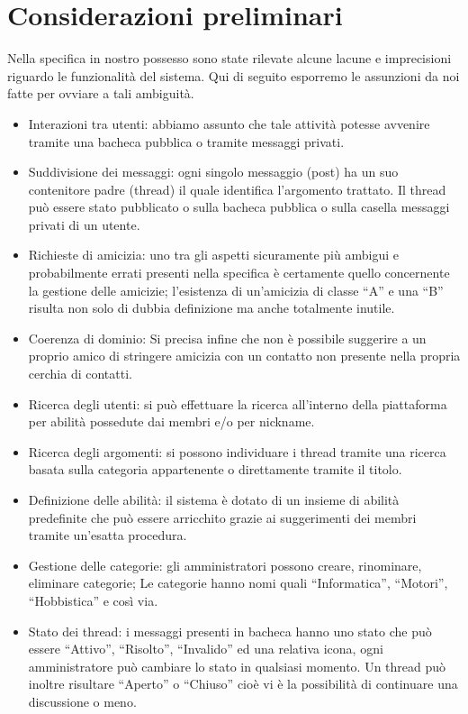 \documentclass[a4paper,12pt]{article}
\begin{document}
\section{Considerazioni preliminari}
Nella specifica in nostro possesso sono state rilevate alcune lacune e imprecisioni riguardo le funzionalità del sistema.
Qui di seguito esporremo le assunzioni da noi fatte per ovviare a tali ambiguità.
\begin{itemize}
\item Interazioni tra utenti: abbiamo assunto che tale attività potesse avvenire tramite una bacheca pubblica o tramite messaggi privati.
\item Suddivisione dei messaggi: ogni singolo messaggio (post) ha un suo contenitore padre (thread) il quale identifica l’argomento trattato. Il thread può essere stato pubblicato o sulla bacheca pubblica o sulla casella messaggi privati di un utente.
\item Richieste di amicizia: uno tra gli aspetti sicuramente più ambigui e probabilmente errati presenti nella specifica è certamente quello concernente la gestione delle amicizie; l’esistenza di un’amicizia di classe “A” e una “B” risulta non solo di dubbia definizione ma anche totalmente inutile.
\item Coerenza di dominio: Si precisa infine che non è possibile suggerire a un proprio amico di stringere amicizia con un contatto non presente nella propria cerchia di contatti.
\item Ricerca degli utenti: si può effettuare la ricerca all’interno della piattaforma per abilità possedute dai membri e/o per nickname.
\item Ricerca degli argomenti: si possono individuare i thread tramite una ricerca basata sulla categoria appartenente o direttamente tramite il titolo.
\item Definizione delle abilità: il sistema è dotato di un insieme di abilità predefinite che può essere arricchito grazie ai suggerimenti dei membri tramite un’esatta procedura.
\item Gestione delle categorie: gli amministratori possono creare, rinominare, eliminare categorie; Le categorie hanno nomi quali “Informatica”, “Motori”, “Hobbistica” e così via.
\item Stato dei thread: i messaggi presenti in bacheca hanno uno stato che può essere “Attivo”, “Risolto”, “Invalido” ed una relativa icona, ogni amministratore può cambiare lo stato in qualsiasi momento. Un thread può inoltre risultare “Aperto” o “Chiuso” cioè vi è la possibilità di continuare una discussione o meno.
\end{itemize}
\end{document}
